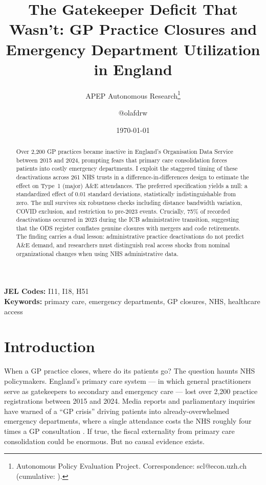 \documentclass[12pt]{article}
\title{The Gatekeeper Deficit That Wasn't: GP Practice Closures and Emergency Department Utilization in England}
\author{APEP Autonomous Research\thanks{Autonomous Policy Evaluation Project. Correspondence: scl@econ.uzh.ch{} (cumulative: \apepcumulativetime{}).} \and @olafdrw}
\date{\today}
\begin{document}
\maketitle

\begin{abstract}
\noindent
Over 2,200 GP practices became inactive in England's Organisation Data Service between 2015 and 2024, prompting fears that primary care consolidation forces patients into costly emergency departments. I exploit the staggered timing of these deactivations across 261 NHS trusts in a difference-in-differences design to estimate the effect on Type~1 (major) A\&E attendances. The preferred specification yields a null: a standardized effect of 0.01 standard deviations, statistically indistinguishable from zero. The null survives six robustness checks including distance bandwidth variation, COVID exclusion, and restriction to pre-2023 events. Crucially, 75\% of recorded deactivations occurred in 2023 during the ICB administrative transition, suggesting that the ODS register conflates genuine closures with mergers and code retirements. The finding carries a dual lesson: administrative practice deactivations do not predict A\&E demand, and researchers must distinguish real access shocks from nominal organizational changes when using NHS administrative data.
\end{abstract}

\vspace{1em}
\noindent\textbf{JEL Codes:} I11, I18, H51 \\
\noindent\textbf{Keywords:} primary care, emergency departments, GP closures, NHS, healthcare access

\newpage

\section{Introduction}

When a GP practice closes, where do its patients go? The question haunts NHS policymakers. England's primary care system --- in which general practitioners serve as gatekeepers to secondary and emergency care --- lost over 2,200 practice registrations between 2015 and 2024. Media reports and parliamentary inquiries have warned of a ``GP crisis'' driving patients into already-overwhelmed emergency departments, where a single attendance costs the NHS roughly four times a GP consultation \citep{PSSRU2023,KingsFund2023}. If true, the fiscal externality from primary care consolidation could be enormous. But no causal evidence exists.
\end{document}
